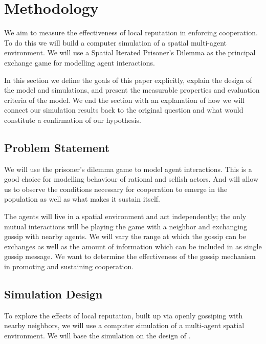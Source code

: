 \documentclass[english]{article}
\begin{document}
\section{Methodology}
We aim to measure the effectiveness of local reputation in enforcing cooperation.
To do this we will build a computer simulation of a spatial multi-agent environment.
We will use a Spatial Iterated Prisoner's Dilemma as the principal exchange game for modelling agent interactions.

In this section we define the goals of this paper explicitly,
explain the design of the model and simulations,
and present the measurable properties and evaluation criteria of the model.
We end the section with an explanation of how we will connect our simulation results back to the original question
and what would constitute a confirmation of our hypothesis.

\subsection{Problem Statement}
We will use the prisoner's dilemma game to model agent interactions.
This is a good choice for modelling behaviour of rational and selfish actors.
And will allow us to observe the conditions necessary for cooperation to emerge in the population as well as what makes it sustain itself.

The agents will live in a spatial environment and act independently;
the only mutual interactions will be playing the game with a neighbor and exchanging gossip with nearby agents.
We will vary the range at which the gossip can be exchanges as well as the amount of information which can be included in as single gossip message.
We want to determine the effectiveness of the gossip mechanism in promoting and sustaining cooperation.

\subsection{Simulation Design}

To explore the effects of local reputation, built up via openly gossiping with nearby neighbors,
we will use a computer simulation of a multi-agent spatial environment.
We will base the simulation on the design of \citet{smaldino}.
\end{document}
